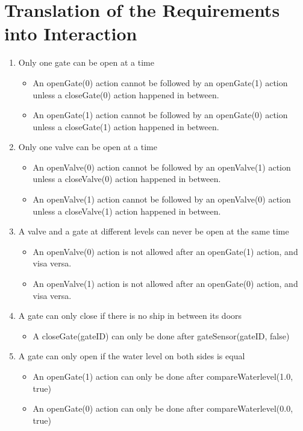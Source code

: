 \section{Translation of the Requirements into Interaction}
\begin{enumerate}
	\item Only one gate can be open at a time	
		\begin{itemize}
			\item An openGate(0) action cannot be followed by an openGate(1) action unless a closeGate(0) action happened in between.
			\item An openGate(1) action cannot be followed by an openGate(0) action unless a closeGate(1) action happened in between.
			
		\end{itemize}
	
	\item Only one valve can be open at a time	
		\begin{itemize}
			\item An openValve(0) action cannot be followed by an openValve(1) action unless a closeValve(0) action happened in between.
			\item An openValve(1) action cannot be followed by an openValve(0) action unless a closeValve(1) action happened in between.
		\end{itemize}
	
	\item A valve and a gate at different levels can never be open at the same time
		\begin{itemize}
			\item An openValve(0) action is not allowed after an openGate(1) action, and visa versa.
			\item An openValve(1) action is not allowed after an openGate(0) action, and visa versa.
		\end{itemize}
	
	\item A gate can only close if there is no ship in between its doors
		\begin{itemize}
			\item A closeGate(gateID) can only be done after gateSensor(gateID, false)
		\end{itemize}
	
	\item A gate can only open if the water level on both sides is equal
		\begin{itemize}
			\item An openGate(1) action can only be done after compareWaterlevel(1.0, true)
			\item An openGate(0) action can only be done after compareWaterlevel(0.0, true)
		\end{itemize}
	

\end{enumerate}

